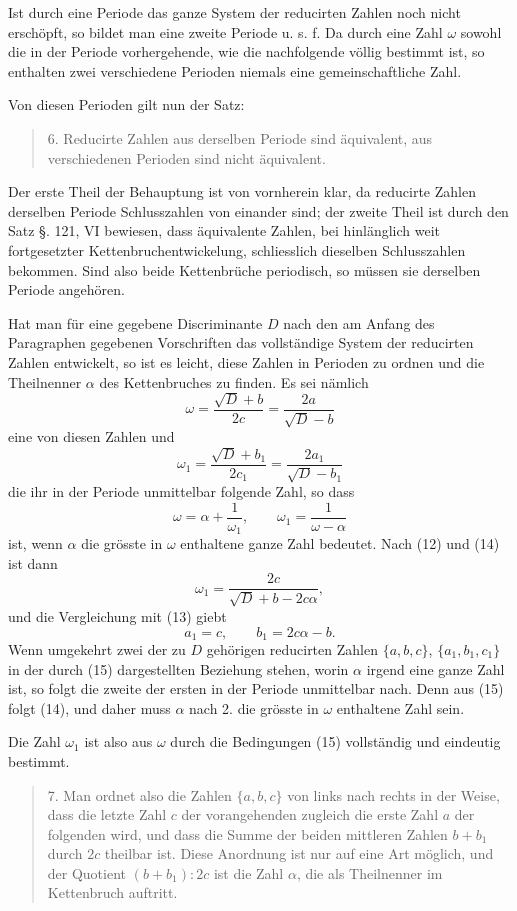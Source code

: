 \documentclass[11pt]{article}
\begin{document}
Ist durch eine Periode das ganze System der reducirten Zahlen noch nicht erschöpft, so bildet man eine zweite Periode u. s. f. Da durch eine Zahl $\omega$ sowohl die in der Periode vorhergehende, wie die nachfolgende völlig bestimmt ist, so enthalten zwei verschiedene Perioden niemals eine gemeinschaftliche Zahl.

Von diesen Perioden gilt nun der Satz:
\begin{quote}
6. Reducirte Zahlen aus derselben Periode sind äquivalent, aus verschiedenen Perioden sind nicht äquivalent.
\end{quote}

Der erste Theil der Behauptung ist von vornherein klar, da reducirte Zahlen derselben Periode Schlusszahlen von einander sind; der zweite Theil ist durch den Satz §. 121, VI bewiesen, dass äquivalente Zahlen, bei hinlänglich weit fortgesetzter Kettenbruchentwickelung, schliesslich dieselben Schlusszahlen bekommen. Sind also beide Kettenbrüche periodisch, so müssen sie derselben Periode angehören.

Hat man für eine gegebene Discriminante $D$ nach den am Anfang des Paragraphen gegebenen Vorschriften das vollständige System der reducirten Zahlen entwickelt, so ist es leicht, diese Zahlen in Perioden zu ordnen und die Theilnenner $\alpha$ des Kettenbruches zu finden. Es sei nämlich
\[
\tag{12}       \omega=\frac{\sqrt D+b}{2c}=\frac{2a}{\sqrt D-b}
\]
eine von diesen Zahlen und
\[
\tag{13}       \omega_1=\frac{\sqrt D+b_1}{2c_1}
=\frac{2a_1}{\sqrt D-b_1}
\]
die ihr in der Periode unmittelbar folgende Zahl, so dass
\[
\tag{14}       \omega=\alpha+\frac1{\omega_1},\qquad
        \omega_1=\frac1{\omega-\alpha}
\]
ist, wenn $\alpha$ die grösste in $\omega$ enthaltene ganze Zahl bedeutet. Nach (12) und (14) ist dann
\[
        \omega_1=\frac{2c}{\sqrt D+b-2c\alpha},
\]
und die Vergleichung mit (13) giebt
\[
\tag{15}       a_1=c,\qquad b_1=2c\alpha-b.
\]
Wenn umgekehrt zwei der zu $D$ gehörigen reducirten Zahlen $\{a,b,c\}$, $\{a_1,b_1,c_1\}$ in der durch (15) dargestellten Beziehung stehen, worin $\alpha$ irgend eine ganze Zahl ist, so folgt die zweite der ersten in der Periode unmittelbar nach. Denn aus (15) folgt (14), und daher muss $\alpha$ nach 2. die grösste in $\omega$ enthaltene Zahl sein.

Die Zahl $\omega_1$ ist also aus $\omega$ durch die Bedingungen (15) vollständig und eindeutig bestimmt.

\begin{quote}
7. Man ordnet also die Zahlen $\{a,b,c\}$ von links nach rechts in der Weise, dass die letzte Zahl $c$ der vorangehenden zugleich die erste Zahl $a$ der folgenden wird, und dass die Summe der beiden mittleren Zahlen $b+b_1$ durch $2c$ theilbar ist. Diese Anordnung ist nur auf eine Art möglich, und der Quotient $(b+b_1):2c$ ist die Zahl $\alpha$, die als Theilnenner im Kettenbruch auftritt.
\end{quote}
\end{document}
